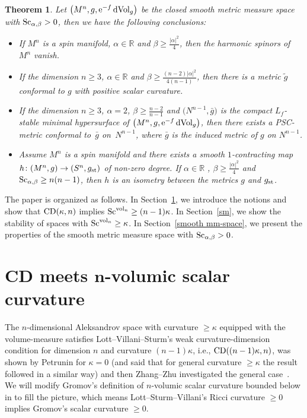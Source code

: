 \documentclass[pdftex]{sigma}
\newtheorem{Theorem}{Theorem}[section]
\begin{document}
\begin{Theorem}
 Let $\big(M^n, g, {\rm e}^{-f}\,{\rm dVol}_g\big)$ be the closed smooth metric measure space with ${\rm Sc}_{\alpha, \beta}>0$, then we have the following conclusions:
 \begin{itemize}\itemsep=0pt
 \item[$1.$] If $M^n$ is a spin manifold, $\alpha \in \mathbb{R}$ and $\beta \geq \frac{|\alpha|^2}{4}$, then the harmonic spinors of $M^n$ vanish.
 \item[$2.$] If the dimension $n\geq 3$, $\alpha \in \mathbb{R}$ and $\beta \geq \frac{(n-2)|\alpha|^2}{4(n-1)}$, then there is a metric $\tilde{g}$ conformal to $g$ with positive scalar curvature.
 \item[$3.$] If the dimension $n\geq 3$, $\alpha=2$, $\beta \geq \frac{n-2}{n-1}$ and $\big(N^{n-1},\bar{g}\big)$ is the compact $L_f$-stable minimal hypersurface of $\big(M^n, g, {\rm e}^{-f}\,{\rm dVol}_g\big)$, then there exists a PSC-metric conformal to~$\bar{g}$ on~$N^{n-1}$, where $\bar{g}$ is the induced metric of $g$ on $N^{n-1}$.

 \item[$4.$] Assume $M^n$ is a spin manifold and there exists a smooth $1$-contracting map $h\colon (M^n, g)\to (S^n, g_{\rm st})$ of non-zero degree. If $\alpha \in \mathbb{R}$ , $\beta \geq \frac{|\alpha|^2}{4}$ and ${\rm Sc}_{\alpha, \beta}\geq n(n-1)$, then $h$ is an isometry between the metrics $g$ and $g_{\rm st}$.
\end{itemize}
\end{Theorem}

The paper is organized as follows. In Section~\ref{CD}, we introduce the notions and show that ${\rm CD}(\kappa,n)$ implies ${\rm Sc}^{{\rm vol}_n}\geq (n-1)\kappa$. In Section~\ref{sm}, we show the stability of spaces with ${\rm Sc}^{{\rm vol}_n}\geq\kappa$. In Section~\ref{smooth mm-space}, we present the properties of the smooth metric measure space with ${\rm Sc}_{\alpha, \beta}>0$.

\section[CD meets n-volumic scalar curvature]{CD meets $\boldsymbol{n}$-volumic scalar curvature}\label{CD}
 The $n$-dimensional Aleksandrov space with curvature $\geq\kappa$ equipped with the volume-measure satisfies Lott--Villani--Sturm's weak curvature-dimension condition for dimension $n$ and curvature $(n-1) \kappa$, i.e., ${\rm CD}((n-1)\kappa, n)$, was shown by Petrunin for $\kappa=0$ (and said that for general curvature $\geq\kappa$ the result followed in a similar way) \cite{MR2869253} and then Zhang--Zhu investigated the general case~\cite{MR2747437}. We will modify Gromov's definition of $n$-volumic scalar curvature bounded below in \cite[Section~26]{Gromov} to fill the picture, which means Lott--Sturm--Villani's Ricci curvature $\geq 0$ implies Gromov's scalar curvature $\geq 0$.
\end{document}
